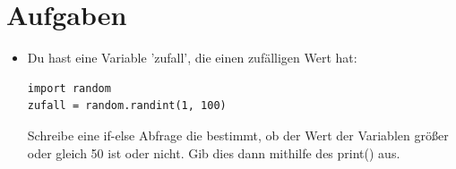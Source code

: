 \documentclass[12pt,a4paper,oneside,ngerman]{scrbook}
\begin{document}
\section{Aufgaben}
\begin{itemize}
	\item Du hast eine Variable 'zufall', die einen zufälligen Wert hat:
	\begin{lstlisting}[caption=Python Code für eine zufällige Variable zwischen 1-100]
import random
zufall = random.randint(1, 100)
	\end{lstlisting}
	Schreibe eine if-else Abfrage die bestimmt, ob der Wert der Variablen größer oder gleich 50 ist oder nicht. Gib dies dann mithilfe des print() aus.
\end{itemize}
\end{document}
